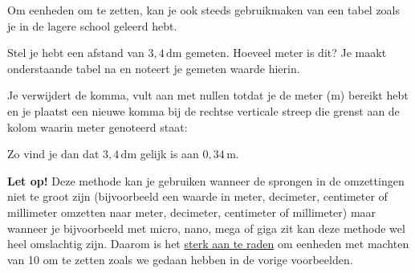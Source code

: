 \documentclass{ximera}
\begin{document}
\begin{remark}\nl
    Om eenheden om te zetten, kan je ook steeds gebruikmaken van een tabel zoals je in de lagere school geleerd hebt.

    Stel je hebt een afstand van $3{,}4 \, \mathrm{dm}$ gemeten. Hoeveel meter is dit? Je maakt onderstaande tabel na en noteert je gemeten waarde hierin.
    \begin{center}
    \end{center}
    Je verwijdert de komma, vult aan met nullen totdat je de meter ($\mathrm{m}$) bereikt hebt en je plaatst een nieuwe komma bij de rechtse verticale streep die grenst aan de kolom waarin meter genoteerd staat:
    \begin{center}
    \end{center}
    Zo vind je dan dat $3{,}4 \, \mathrm{dm}$ gelijk is aan $0{,}34 \, \mathrm{m}$.

    \textbf{Let op!} Deze methode kan je gebruiken wanneer de sprongen in de omzettingen niet te groot zijn (bijvoorbeeld een waarde in meter, decimeter, centimeter of millimeter omzetten naar meter, decimeter, centimeter of millimeter) maar wanneer je bijvoorbeeld met micro, nano, mega of giga zit kan deze methode wel heel omslachtig zijn. Daarom is het \underline{sterk aan te raden} om eenheden met machten van 10 om te zetten zoals we gedaan hebben in de vorige voorbeelden.
\end{remark}
\end{document}
